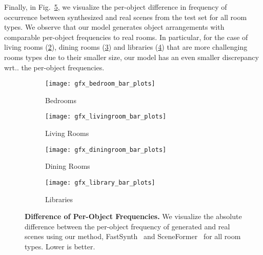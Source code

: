 \documentclass{article}
\makeatletter
\DeclareRobustCommand\onedot{\futurelet\@let@token\@onedot}
\def\@onedot{\ifx\@let@token.\else.\null\fi\xspace}
\def\wrt{wrt\onedot}
\newcommand{\figref}[1]{Fig.~\ref{#1}}
\makeatother
\begin{document}
Finally, in \figref{fig:freq_occurency_rooms}, we visualize the per-object
difference in frequency of occurrence between synthesized and real scenes from
the test set for all room types. We observe that our model generates object
arrangements with comparable per-object frequencies to real rooms. In
particular, for the case of living rooms (\ref{fig:living_bar_plots}), dining
rooms (\ref{fig:dining_bar_plots}) and libraries
(\ref{fig:library_bar_plots}) that are more challenging rooms types due to
their smaller size, our model has an even smaller discrepancy \wrt the
per-object frequencies.

\begin{figure}
    \centering
    \begin{subfigure}[b]{\textwidth}
         \centering
         \texttt{[image: gfx\_bedroom\_bar\_plots]}
         \vspace{-2.2em}
         \caption{Bedrooms}
         \label{fig:bedroom_bar_plots}
     \end{subfigure}
     \hfill
     \begin{subfigure}[b]{\textwidth}
         \centering
         \texttt{[image: gfx\_livingroom\_bar\_plots]}
         \vspace{-2.2em}
         \caption{Living Rooms}
         \label{fig:living_bar_plots}
     \end{subfigure}
     \hfill
     \begin{subfigure}[b]{\textwidth}
         \centering
         \texttt{[image: gfx\_diningroom\_bar\_plots]}
         \vspace{-2.2em}
         \caption{Dining Rooms}
         \label{fig:dining_bar_plots}
     \end{subfigure}
     \begin{subfigure}[b]{\textwidth}
         \centering
         \texttt{[image: gfx\_library\_bar\_plots]}
         \vspace{-2.2em}
         \caption{Libraries}
         \label{fig:library_bar_plots}
     \end{subfigure}
     \caption{\textbf{Difference of Per-Object Frequencies.} We visualize the
     absolute difference between the per-object frequency of generated and real
     scenes using our method, FastSynth~\cite{Ritchie2019CVPR} and
     SceneFormer~\cite{Wang2020ARXIV} for all room types. Lower is better.}
     \label{fig:freq_occurency_rooms}
\end{figure}
\end{document}
